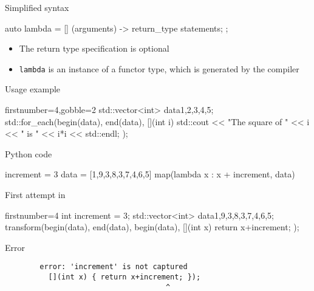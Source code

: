 \begin{frame}[fragile]
  \begin{block}{Simplified syntax}
    \begin{cppcode*}{}
      auto lambda = [] (arguments) -> return_type {
        statements;
      };
    \end{cppcode*}
    \begin{itemize}
    \item The return type specification is optional
    \item \texttt{lambda} is an instance of a functor type, which is generated by the compiler
    \end{itemize}
  \end{block}
  \begin{exampleblock}{Usage example}
    \begin{cppcode*}{firstnumber=4,gobble=2}
      std::vector<int> data{1,2,3,4,5};
      std::for_each(begin(data), end(data), [](int i) {
        std::cout << "The square of " << i
                  << " is " << i*i << std::endl;
      });
    \end{cppcode*}
  \end{exampleblock}
\end{frame}


\begin{frame}[fragile]
  \begin{block}{Python code}
    \begin{pythoncode*}{}
      increment = 3
      data = [1,9,3,8,3,7,4,6,5]
      map(lambda x : x + increment, data)
    \end{pythoncode*}
  \end{block}
  \pause
  \begin{block}{First attempt in \cpp}
    \begin{cppcode*}{firstnumber=4}
      int increment = 3;
      std::vector<int> data{1,9,3,8,3,7,4,6,5};
      transform(begin(data), end(data), begin(data),
                [](int x) { return x+increment; });
    \end{cppcode*}
  \end{block}
  \pause
  \begin{alertblock}{Error}
    \begin{verbatim}
        error: 'increment' is not captured
          [](int x) { return x+increment; });
                                     ^
    \end{verbatim}
  \end{alertblock}
\end{frame}

